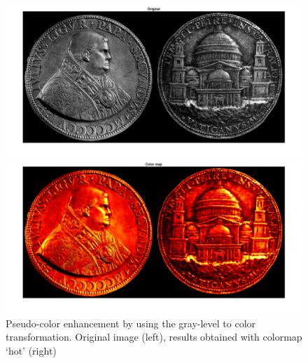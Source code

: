 \documentclass[conference]{IEEEtran}
\begin{document}
\begin{figure}[ht]
\begin{multicols}{2}
    \includegraphics[width=1.1\linewidth]{colmap11.png}\par 
    \includegraphics[width=1.1\linewidth]{colmap12.png}\par 
    \end{multicols}
\caption{Pseudo-color enhancement by using the gray-level to color transformation. Original image (left), results obtained with colormap `hot' (right)}
\label{colmap_1}
\end{figure}
\end{document}
